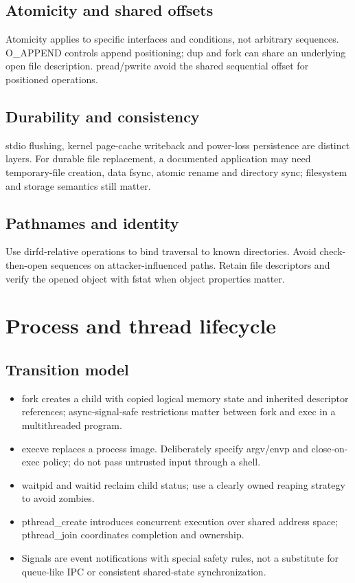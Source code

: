 \documentclass[11pt,letterpaper,oneside]{report}
\begin{document}
\section{Atomicity and shared offsets}
Atomicity applies to specific interfaces and conditions, not arbitrary sequences. O\_APPEND controls append positioning; dup and fork can share an underlying open file description. pread/pwrite avoid the shared sequential offset for positioned operations.

\section{Durability and consistency}
stdio flushing, kernel page-cache writeback and power-loss persistence are distinct layers. For durable file replacement, a documented application may need temporary-file creation, data fsync, atomic rename and directory sync; filesystem and storage semantics still matter.

\section{Pathnames and identity}
Use dirfd-relative operations to bind traversal to known directories. Avoid check-then-open sequences on attacker-influenced paths. Retain file descriptors and verify the opened object with fstat when object properties matter.

\chapter{Process and thread lifecycle}
\section{Transition model}
\begin{itemize}
\item fork creates a child with copied logical memory state and inherited descriptor references; async-signal-safe restrictions matter between fork and exec in a multithreaded program.
\item execve replaces a process image. Deliberately specify argv/envp and close-on-exec policy; do not pass untrusted input through a shell.
\item waitpid and waitid reclaim child status; use a clearly owned reaping strategy to avoid zombies.
\item pthread\_create introduces concurrent execution over shared address space; pthread\_join coordinates completion and ownership.
\item Signals are event notifications with special safety rules, not a substitute for queue-like IPC or consistent shared-state synchronization.
\end{itemize}
\end{document}
